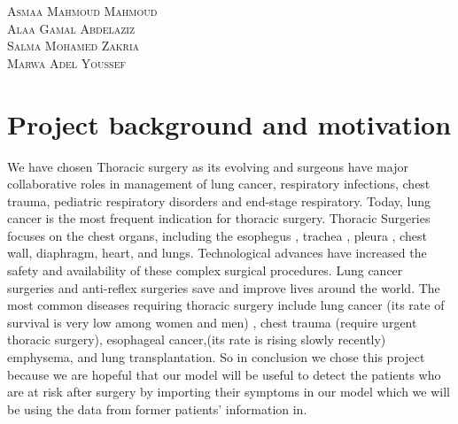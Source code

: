 \documentclass[a4paper, 11pt, oneside]{article} %
\begin{document}
\begin{titlepage}
	\vspace{0.5\baselineskip} %
  
	
	{\scshape\Large Asmaa Mahmoud Mahmoud\\ Alaa Gamal Abdelaziz\\Salma Mohamed Zakria\\Marwa Adel Youssef\\} %
	
	
	
	\vfill %
	
	

	
	\vspace{0.3\baselineskip} %
	
	
	

\end{titlepage}

\section{Project background and motivation}

We have chosen Thoracic surgery as its evolving and surgeons have major collaborative roles in management of lung cancer, respiratory infections, chest trauma, pediatric respiratory disorders and end-stage respiratory. Today, lung cancer is the most frequent indication for thoracic surgery.
Thoracic Surgeries focuses on the chest organs, including the esophegus , trachea , pleura , chest wall, diaphragm, heart, and lungs. Technological advances have increased the safety and availability of these complex surgical procedures. Lung cancer surgeries and anti-reflex surgeries save and improve lives around the world.
The most common diseases requiring thoracic surgery include lung cancer (its rate of survival is very low among women and men) , chest trauma (require urgent thoracic surgery), esophageal cancer,(its rate is rising slowly recently) emphysema, and lung transplantation.
So in conclusion we chose this project because we are hopeful that our model will be useful to detect the patients who are at risk after surgery by importing their symptoms in our model which we will be using the data from former patients’ information in.
\newpage
\end{document}
